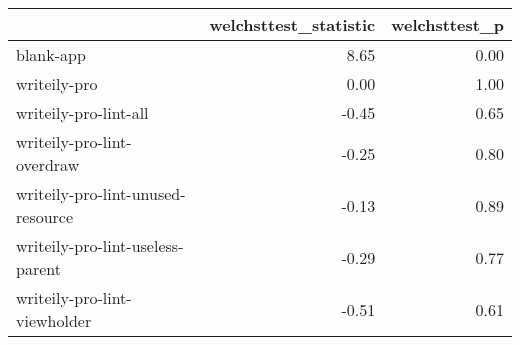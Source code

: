 \begin{tabular}{lrr}
\toprule
{} &  welchsttest\_statistic &  welchsttest\_p \\
\midrule
blank-app                         &                   8.65 &           0.00 \\
writeily-pro                      &                   0.00 &           1.00 \\
writeily-pro-lint-all             &                  -0.45 &           0.65 \\
writeily-pro-lint-overdraw        &                  -0.25 &           0.80 \\
writeily-pro-lint-unused-resource &                  -0.13 &           0.89 \\
writeily-pro-lint-useless-parent  &                  -0.29 &           0.77 \\
writeily-pro-lint-viewholder      &                  -0.51 &           0.61 \\
\bottomrule
\end{tabular}

